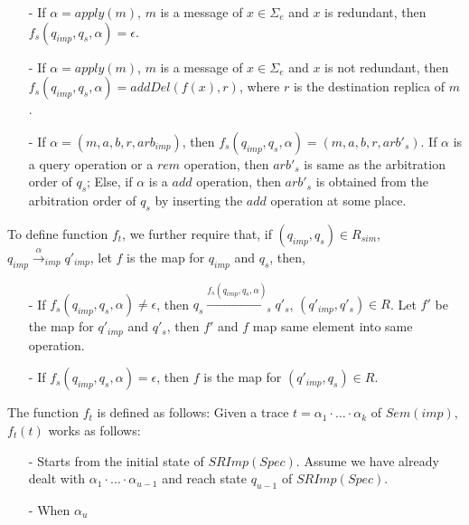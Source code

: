 \begin{itemize}
\setlength{\itemsep}{0.5pt}
\item[-] If $\alpha = apply(m)$, $m$ is a message of $x \in \Sigma_e$ and $x$ is redundant, then $f_s(q_{\mathit{imp}},q_s,\alpha) = \epsilon$. 

\item[-] If $\alpha = apply(m)$, $m$ is a message of $x \in \Sigma_e$ and $x$ is not redundant, then $f_s(q_{\mathit{imp}},q_s,\alpha) = addDel(f(x),r)$, where $r$ is the destination replica of $m$. 

\item[-] If $\alpha = (m,a,b,r,\mathit{arb}_{\mathit{imp}})$, then $f_s(q_{\mathit{imp}},q_s,\alpha) = (m,a,b,r,\mathit{arb}'_s)$. If $\alpha$ is a query operation or a $\mathit{rem}$ operation, then $\mathit{arb}'_s$ is same as the arbitration order of $q_s$; Else, if $\alpha$ is a $add$ operation, then $\mathit{arb}'_s$ is obtained from the arbitration order of $q_s$ by inserting the $add$ operation at some place. 
\end{itemize} 

To define function $f_t$, we further require that, if $(q_{\mathit{imp}},q_s) \in R_{\mathit{sim}}$, $q_{\mathit{imp}} {\xrightarrow{\alpha}}_{\mathit{imp}} q'_{\mathit{imp}}$, let $f$ is the map for $q_{\mathit{imp}}$ and $q_s$, then,

\begin{itemize}
\setlength{\itemsep}{0.5pt}
\item[-] If $f_s(q_{\mathit{imp}},q_s,\alpha) \neq \epsilon$, then $q_s {\xrightarrow{f_s(q_{\mathit{imp}},q_s,\alpha)}}_s q'_s$, $(q'_{\mathit{imp}},q'_s) \in R$. Let $f'$ be the map for $q'_{\mathit{imp}}$ and $q'_s$, then $f'$ and $f$ map same element into same operation. 

\item[-] If $f_s(q_{\mathit{imp}},q_s,\alpha) = \epsilon$, then $f$ is the map for $(q'_{\mathit{imp}},q_s) \in R$. 
\end{itemize}

The function $f_t$ is defined as follows: Given a trace $t = \alpha_1 \cdot \ldots \cdot \alpha_k$ of $Sem(imp)$, $f_t(t)$ works as follows: 

\begin{itemize}
\setlength{\itemsep}{0.5pt}
\item[-] Starts from the initial state of $SRImp(Spec)$. Assume we have already dealt with $\alpha_1 \cdot \ldots \cdot \alpha_{u-1}$ and reach state $q_{u-1}$ of $SRImp(Spec)$.    

\item[-] When $\alpha_u$

\end{itemize}


